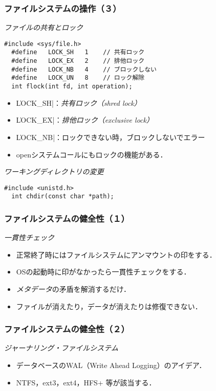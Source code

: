\documentclass{beamer}                   %
\begin{document}
\begin{frame}[fragile]
  \frametitle{ファイルシステムの操作（３）}
  \emph{ファイルの共有とロック}
\begin{lstlisting}[numbers=none]
  #include <sys/file.h>
  #define   LOCK_SH   1    // 共有ロック
  #define   LOCK_EX   2    // 排他ロック
  #define   LOCK_NB   4    // ブロックしない
  #define   LOCK_UN   8    // ロック解除
  int flock(int fd, int operation);
\end{lstlisting}
  \begin{itemize}
  \item \|LOCK_SH|：\emph{共有ロック（shred lock）}
  \item \|LOCK_EX|：\emph{排他ロック（exclusive lock）}
  \item \|LOCK_NB|：ロックできない時，ブロックしないでエラー
  \item openシステムコールにもロックの機能がある．
  \end{itemize}
  \vfill

  \emph{ワーキングディレクトリの変更}
\begin{lstlisting}[numbers=none]
  #include <unistd.h>
  int chdir(const char *path);
\end{lstlisting}

  \vfill
\end{frame}

\begin{frame}
  \frametitle{ファイルシステムの健全性（１）}
  \emph{一貫性チェック}
  \begin{itemize}
  \item 正常終了時にはファイルシステムにアンマウントの印をする．
  \item OSの起動時に印がなかったら一貫性チェックをする．
  \item \emph{メタデータ}の矛盾を解消するだけ．
  \item ファイルが消えたり，データが消えたりは修復できない．
  \end{itemize}
  \vfill
\end{frame}

\begin{frame}
  \frametitle{ファイルシステムの健全性（２）}
  \emph{ジャーナリング・ファイルシステム}
  \begin{itemize}
  \item データベースのWAL（Write Ahead Logging）のアイデア．
  \item NTFS，ext3，ext4，HFS+ 等が該当する．
  \end{itemize}
  \vfill
\end{frame}

\end{document}
